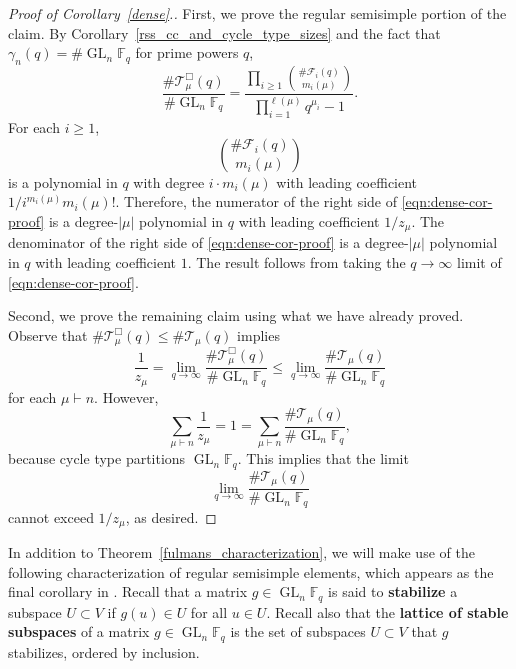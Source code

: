 \documentclass[10pt]{article}
\theoremstyle{definition}
\DeclareMathOperator{\GL}{GL}
\newcommand{\F}{\mathbb{F}}
\newcommand{\CF}{\mathcal{F}}
\newcommand{\CT}{\mathcal{T}}
\newcommand{\myemph}{\textbf}
\begin{document}
\begin{proof}[Proof of Corollary~\ref{dense}.]
First, we prove the regular semisimple portion of the claim.
By Corollary~\ref{rss_cc_and_cycle_type_sizes} and the fact that \(\gamma_n (q) = \# \GL_n \F_q\) for prime powers \(q\),
\begin{equation}
\label{eqn:dense-cor-proof}
\frac{\#\CT_\mu^\Box (q)}{\# \GL_n \F_q} = \frac{\prod_{i \geq 1} \binom{\# \CF_i (q)}{m_i(\mu)}}{\prod_{i=1}^{\ell(\mu)} q^{\mu_i}-1}.
\end{equation}
For each \(i \geq 1\),
\begin{equation}
\binom{\# \CF_i (q)}{m_i (\mu)}
\end{equation}
is a polynomial in \(q\) with degree \(i \cdot m_i (\mu)\) with leading coefficient \(1 / i^{m_i(\mu)} m_i(\mu)!\).
Therefore, the numerator of the right side of \eqref{eqn:dense-cor-proof} is a degree-\(|\mu|\) polynomial in \(q\) with leading coefficient \(1 / z_\mu\).
The denominator of the right side of \eqref{eqn:dense-cor-proof} is a degree-\(|\mu|\) polynomial in \(q\) with leading coefficient \(1\).
The result follows from taking the \(q \to \infty\) limit of \eqref{eqn:dense-cor-proof}.

Second, we prove the remaining claim using what we have already proved.
Observe that \(\# \CT_\mu^\Box (q) \leq \# \CT_\mu (q)\) implies
\begin{equation}
\frac{1}{z_\mu}
=
\lim_{q \to \infty}
\frac{\# \CT_\mu^\Box (q)}{\# \GL_n \F_q}
\leq
\lim_{q \to \infty} \frac{\# \CT_\mu (q)}{\# \GL_n \F_q}
\end{equation}
for each \(\mu \vdash n\).
However,
\begin{equation}
	\sum_{\mu \vdash n}
	\frac{1}{z_\mu}
	=
	1
	=
	\sum_{\mu \vdash n}
	\frac{\# \CT_\mu (q)}{\# \GL_n \F_q},
\end{equation}
because cycle type partitions \(\GL_n \F_q\).
This implies that the limit
\begin{equation}
	\lim_{q \to \infty} \frac{\# \CT_\mu (q)}{\# \GL_n \F_q}
\end{equation}
cannot exceed \(1 / z_\mu\), as desired.
\end{proof}




In addition to Theorem~\ref{fulmans_characterization}, we will make use of the following characterization of regular semisimple elements, which appears as the final corollary in \cite[Section~3]{lattice}.
Recall that a matrix \(g \in \GL_n \F_q\) is said to \myemph{stabilize} a subspace \(U \subset V\) if \(g(u) \in U\) for all \(u \in U\).
Recall also that the \myemph{lattice of stable subspaces} of a matrix $g \in \GL_n \F_q$ is the set of subspaces $U \subset V$ that \(g\) stabilizes, ordered by inclusion.
\end{document}
